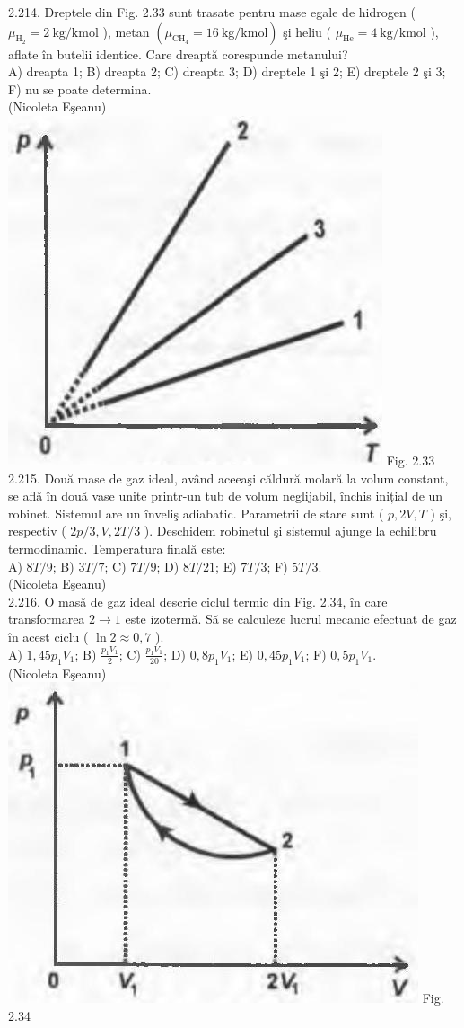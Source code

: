2.214. Dreptele din Fig. 2.33 sunt trasate pentru mase egale de hidrogen ( $\mu_{\mathrm{H}_{2}}=2 \mathrm{~kg} / \mathrm{kmol}$ ), metan $\left(\mu_{\mathrm{CH}_{4}}=16 \mathrm{~kg} / \mathrm{kmol}\right)$ şi heliu ( $\mu_{\mathrm{He}}=4 \mathrm{~kg} / \mathrm{kmol}$ ), aflate în butelii identice. Care dreaptă corespunde metanului?\\ A) dreapta 1; B) dreapta 2; C) dreapta 3; D) dreptele 1 şi 2; E) dreptele 2 şi 3; F) nu se poate determina.\\ (Nicoleta Eşeanu)\\ \includegraphics[width=0.4\linewidth]{images/2025_07_01_5b3ff9fa0d508c8e9f17g-122} Fig. 2.33\\

2.215. Două mase de gaz ideal, având aceeaşi căldură molară la volum constant, se află în două vase unite printr-un tub de volum neglijabil, închis inițial de un robinet. Sistemul are un înveliş adiabatic. Parametrii de stare sunt ( $p, 2 V, T$ ) şi, respectiv ( $2 p / 3, V, 2 T / 3$ ). Deschidem robinetul şi sistemul ajunge la echilibru termodinamic. Temperatura finală este:\\ A) $8 T / 9$; B) $3 T / 7$; C) $7 T / 9$; D) $8 T / 21$; E) $7 T / 3$; F) $5 T / 3$.\\ (Nicoleta Eşeanu)\\

2.216. O masă de gaz ideal descrie ciclul termic din Fig. 2.34, în care transformarea $2 \rightarrow 1$ este izotermă. Să se calculeze lucrul mecanic efectuat de gaz în acest ciclu ( $\ln 2 \approx 0,7$ ).\\ A) $1,45 p_{1} V_{1}$; B) $\frac{p_{1} V_{1}}{2}$; C) $\frac{p_{1} V_{1}}{20}$; D) $0,8 p_{1} V_{1}$; E) $0,45 p_{1} V_{1}$; F) $0,5 p_{1} V_{1}$.\\ (Nicoleta Eşeanu)\\ \includegraphics[width=0.4\linewidth]{images/2025_07_01_5b3ff9fa0d508c8e9f17g-122(1)} Fig. 2.34\\

